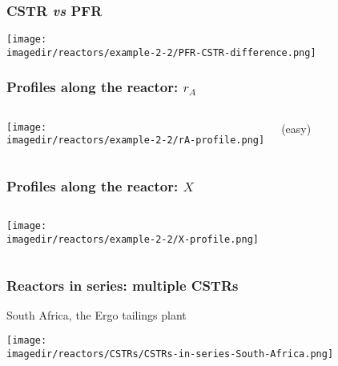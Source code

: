 \begin{frame}\frametitle{CSTR \emph{vs} PFR}
	\begin{center}
		\texttt{[image: \\imagedir/reactors/example-2-2/PFR-CSTR-difference.png]}
	\end{center}
\end{frame}

\begin{frame}\frametitle{Profiles along the reactor: $r_A$}
	\begin{columns}[c]
		\begin{center}
			\texttt{[image: \\imagedir/reactors/example-2-2/rA-profile.png]}
		\end{center}
			{\color{myOrange}{How was this found?}} (easy)
	\end{columns}
\end{frame}


\begin{frame}\frametitle{Profiles along the reactor: $X$}
	\begin{columns}[c]
			\begin{center}
				\texttt{[image: \\imagedir/reactors/example-2-2/X-profile.png]}
			\end{center}
			{\color{myOrange}{How was this found?}}
	\end{columns}	
\end{frame}


\begin{frame}\frametitle{Reactors in series: multiple CSTRs}
	South Africa, the Ergo tailings plant
	\begin{center}
		\texttt{[image: \\imagedir/reactors/CSTRs/CSTRs-in-series-South-Africa.png]}
	\end{center}
\end{frame}

